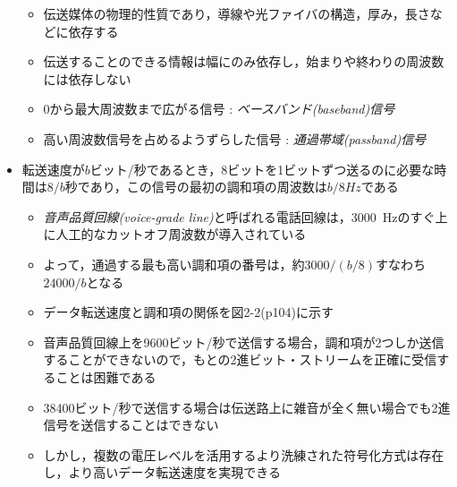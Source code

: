 \documentclass[a4paper]{ltjsarticle}
\begin{document}
\begin{itemize}
\begin{itemize}
					\item 伝送媒体の物理的性質であり，導線や光ファイバの構造，厚み，長さなどに依存する
					\item 伝送することのできる情報は幅にのみ依存し，始まりや終わりの周波数には依存しない
					\item 0から最大周波数まで広がる信号 : \emph{ベースバンド(baseband)信号}
					\item 高い周波数信号を占めるようずらした信号 : \emph{通過帯域(passband)信号}
				\end{itemize}
				\item 転送速度が$b$ビット/秒であるとき，8ビットを1ビットずつ送るのに必要な時間は$8/b$秒であり，この信号の最初の調和項の周波数は$b/8 \si{Hz}$である
				\begin{itemize}
					\item \emph{音声品質回線(voice-grade line)}と呼ばれる電話回線は，\SI{3000}{Hz}のすぐ上に人工的なカットオフ周波数が導入されている
					\item よって，通過する最も高い調和項の番号は，約$3000/(b/8)$すなわち$24000/b$となる
					\item データ転送速度と調和項の関係を図2-2(p104)に示す
					\item 音声品質回線上を9600ビット/秒で送信する場合，調和項が2つしか送信することができないので，もとの2進ビット・ストリームを正確に受信することは困難である
					\item 38400ビット/秒で送信する場合は伝送路上に雑音が全く無い場合でも2進信号を送信することはできない
					\item しかし，複数の電圧レベルを活用するより洗練された符号化方式は存在し，より高いデータ転送速度を実現できる
				\end{itemize}
      \end{itemize}
\end{document}
